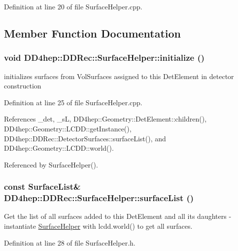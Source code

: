 Definition at line 20 of file SurfaceHelper.cpp.

\subsection{Member Function Documentation}
\hypertarget{class_d_d4hep_1_1_d_d_rec_1_1_surface_helper_ac394507ee2065b75f9540b388fd87170}{
\subsubsection[{initialize}]{\setlength{\rightskip}{0pt plus 5cm}void DD4hep::DDRec::SurfaceHelper::initialize ()}}
\label{class_d_d4hep_1_1_d_d_rec_1_1_surface_helper_ac394507ee2065b75f9540b388fd87170}


initializes surfaces from VolSurfaces assigned to this DetElement in detector construction 

Definition at line 25 of file SurfaceHelper.cpp.

References \_\-det, \_\-sL, DD4hep::Geometry::DetElement::children(), DD4hep::Geometry::LCDD::getInstance(), DD4hep::DDRec::DetectorSurfaces::surfaceList(), and DD4hep::Geometry::LCDD::world().

Referenced by SurfaceHelper().\hypertarget{class_d_d4hep_1_1_d_d_rec_1_1_surface_helper_afd1438e4c040058aac95a8af0167c91d}{
\subsubsection[{surfaceList}]{\setlength{\rightskip}{0pt plus 5cm}const {\bf SurfaceList}\& DD4hep::DDRec::SurfaceHelper::surfaceList ()}}
\label{class_d_d4hep_1_1_d_d_rec_1_1_surface_helper_afd1438e4c040058aac95a8af0167c91d}
Get the list of all surfaces added to this DetElement and all its daughters -\/ instantiate \hyperlink{class_d_d4hep_1_1_d_d_rec_1_1_surface_helper}{SurfaceHelper} with lcdd.world() to get all surfaces. 

Definition at line 28 of file SurfaceHelper.h.

